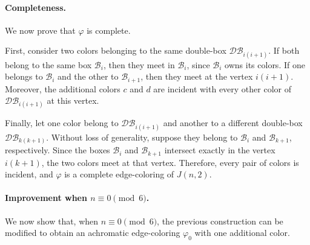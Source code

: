 \documentclass{article}
\newcommand{\Z}{\mathbb{Z}}
\newcommand{\blue}[1]{\textcolor{blue}{#1}}
\newcommand{\red}[1]{\textcolor{red}{#1}}
\begin{document}
\paragraph{Completeness.} We now prove that $\varphi$ is complete.

First, consider two colors belonging to the same double-box
$\mathcal{DB}_{i(i+1)}$. If both belong to the same box
$\mathcal{B}_i$, then they meet in $\mathcal{B}_i$, since
$\mathcal{B}_i$ owns its colors. If one belongs to $\mathcal{B}_i$
and the other to $\mathcal{B}_{i+1}$, then they meet at the vertex
$i(i+1)$. Moreover, the additional colors $c$ and $d$ are incident
with every other color of $\mathcal{DB}_{i(i+1)}$ at this vertex.

Finally, let one color belong to
$\mathcal{DB}_{i(i+1)}$ and another to a different double-box
$\mathcal{DB}_{k(k+1)}$. Without loss of generality, suppose they
belong to $\mathcal{B}_i$ and $\mathcal{B}_{k+1}$, respectively.
Since the boxes $\mathcal{B}_i$ and $\mathcal{B}_{k+1}$ intersect
exactly in the vertex $i(k+1)$, the two colors meet at that vertex.
Therefore, every pair of colors is incident, and $\varphi$ is a
complete edge-coloring of $J(n,2)$.




\paragraph{Improvement when $n\equiv0\pmod6$.} We now show that, when $n \equiv 0 \pmod{6}$, the previous construction can be modified to obtain an achromatic edge-coloring $\varphi_0$ with one additional color. 
\end{document}
